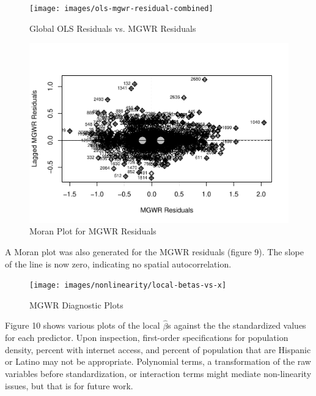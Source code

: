 \documentclass[
]{article}
\begin{document}
\begin{figure}[H]

{\centering \texttt{[image: images/ols-mgwr-residual-combined]} 

}

\caption{Global OLS Residuals vs. MGWR Residuals}\label{fig:unnamed-chunk-20}
\end{figure}

\newpage

\begin{figure}[H]

{\centering \includegraphics[width=1\linewidth]{final-project-write-up-nathan-nguyen_files/figure-latex/unnamed-chunk-21-1} 

}

\caption{Moran Plot for MGWR Residuals}\label{fig:unnamed-chunk-21}
\end{figure}

A Moran plot was also generated for the MGWR residuals (figure 9). The
slope of the line is now zero, indicating no spatial autocorrelation.

\newpage

\begin{figure}[H]

{\centering \texttt{[image: images/nonlinearity/local-betas-vs-x]} 

}

\caption{MGWR Diagnostic Plots}\label{fig:unnamed-chunk-22}
\end{figure}

Figure 10 shows various plots of the local \(\hat{\beta}\)s against the
the standardized values for each predictor. Upon inspection, first-order
specifications for population density, percent with internet access, and
percent of population that are Hispanic or Latino may not be
appropriate. Polynomial terms, a transformation of the raw variables
before standardization, or interaction terms might mediate non-linearity
issues, but that is for future work.
\end{document}
